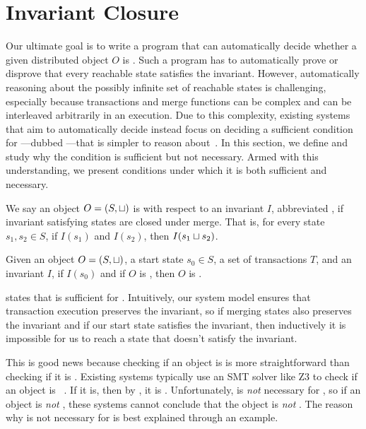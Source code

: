 \section{Invariant Closure}
Our ultimate goal is to write a program that can automatically decide whether a
given distributed object $O$ is \sTIconfluent{}. Such a program has to
automatically prove or disprove that every reachable state satisfies the
invariant. However, automatically reasoning about the possibly infinite set of
reachable states is challenging, especially because transactions and merge
functions can be complex and can be interleaved arbitrarily in an execution.
Due to this complexity, existing systems that aim to automatically decide
\invariantconfluence{} instead focus on deciding a sufficient condition for
\invariantconfluence{}---dubbed ---that is simpler
to reason about~\cite{li2012making, li2014automating}. In this section, we
define \invariantclosure{} and study why the condition is sufficient but not
necessary.  Armed with this understanding, we present conditions under which it
is both sufficient and necessary.

We say an object $O = (S, \sqcup)$ is  with respect
to an invariant $I$, abbreviated , if invariant satisfying
states are closed under merge. That is, for every state $s_1, s_2 \in S$, if
$I(s_1)$ and $I(s_2)$, then $I(s_1 \sqcup s_2)$.

\begin{theorem}
  Given an object $O = (S, \sqcup)$, a start state $s_0 \in S$, a set of
  transactions $T$, and an invariant $I$, if $I(s_0)$ and if $O$ is \Iclosed{},
  then $O$ is \sTIconfluent{}.
\end{theorem}

 states that \invariantclosure{} is
sufficient for \invariantconfluence{}. Intuitively, our system model ensures
that transaction execution preserves the invariant, so if merging states also
preserves the invariant and if our start state satisfies the invariant, then
inductively it is impossible for us to reach a state that doesn't satisfy the
invariant.

This is good news because checking if an object is \invariantclosed{} is more
straightforward than checking if it is \invariantconfluent{}. Existing systems
typically use an SMT solver like Z3 to check if an object is
\invariantclosed{}~\cite{de2008z3, balegas2015putting, gotsman2016cause}. If it
is, then by , it is \invariantconfluent{}.
Unfortunately, \invariantclosure{} is \emph{not} necessary for
\invariantconfluence{}, so if an object is \emph{not} \invariantclosed{}, these
systems cannot conclude that the object is \emph{not} \invariantconfluent{}.
The reason why \invariantclosure{} is not necessary for \invariantconfluence{}
is best explained through an example.

